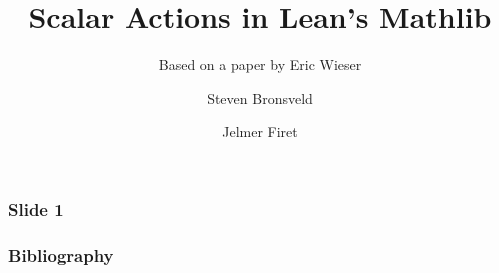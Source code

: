 \documentclass{beamer}
\author{Steven Bronsveld \and Jelmer Firet}
\title[Scalar Actions]{Scalar Actions in Lean's Mathlib}
\subtitle{Based on a paper by Eric Wieser\cite{wieserScalarActionsLean2021}}
\institute[Radboud University Nijmegen]{Radboud University Nijmegen}
\begin{document}
	\begin{frame}[t]
	\titlepage
	\end{frame}

	\begin{frame}[t]
	\frametitle{Slide 1}
		
	\end{frame}

	\begin{frame}[t]
	\frametitle{Bibliography}
		\printbibliography
	\end{frame}
\end{document}
